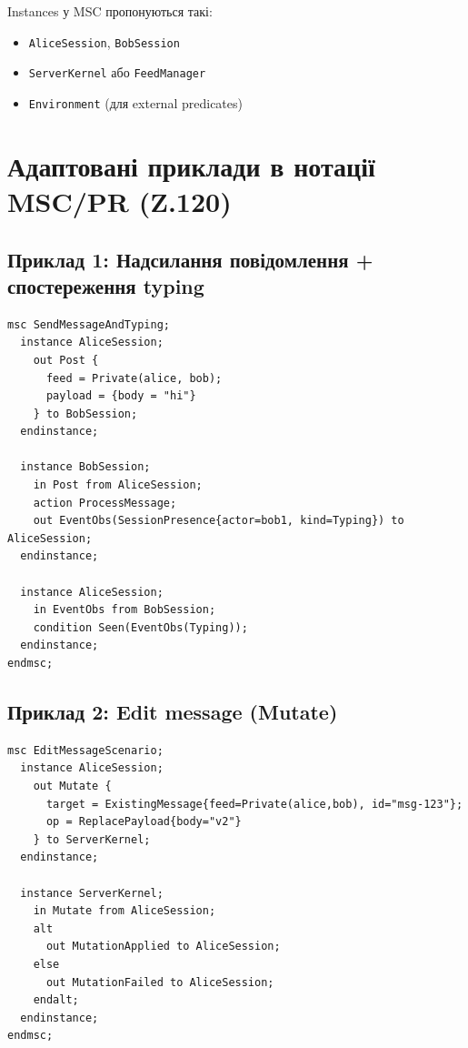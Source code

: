 \documentclass{article}
\begin{document}
Instances у MSC пропонуються такі:
\begin{itemize}
    \item \texttt{AliceSession}, \texttt{BobSession}
    \item \texttt{ServerKernel} або \texttt{FeedManager}
    \item \texttt{Environment} (для external predicates)
\end{itemize}

\section{Адаптовані приклади в нотації MSC/PR (Z.120)}

\subsection{Приклад 1: Надсилання повідомлення + спостереження typing}

\begin{lstlisting}[language={},basicstyle=\ttfamily\small]
msc SendMessageAndTyping;
  instance AliceSession;
    out Post {
      feed = Private(alice, bob);
      payload = {body = "hi"}
    } to BobSession;
  endinstance;

  instance BobSession;
    in Post from AliceSession;
    action ProcessMessage;
    out EventObs(SessionPresence{actor=bob1, kind=Typing}) to AliceSession;
  endinstance;

  instance AliceSession;
    in EventObs from BobSession;
    condition Seen(EventObs(Typing));
  endinstance;
endmsc;
\end{lstlisting}

\subsection{Приклад 2: Edit message (Mutate)}

\begin{lstlisting}[language={},basicstyle=\ttfamily\small]
msc EditMessageScenario;
  instance AliceSession;
    out Mutate {
      target = ExistingMessage{feed=Private(alice,bob), id="msg-123"};
      op = ReplacePayload{body="v2"}
    } to ServerKernel;
  endinstance;

  instance ServerKernel;
    in Mutate from AliceSession;
    alt
      out MutationApplied to AliceSession;
    else
      out MutationFailed to AliceSession;
    endalt;
  endinstance;
endmsc;
\end{lstlisting}
\end{document}

